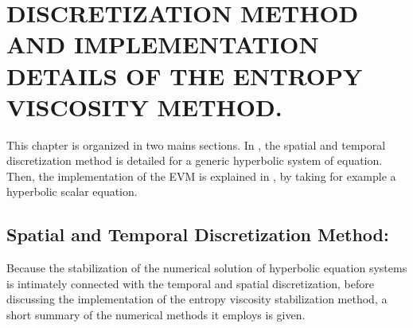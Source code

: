 %
%
%

\chapter{\uppercase {Discretization method and implementation details of the entropy viscosity method.}}\label{chap:disc_chap2}
This chapter is organized in two mains sections. In , the spatial and temporal discretization method is detailed for a generic hyperbolic system of equation. Then, the implementation of the EVM is explained in , by taking for example a hyperbolic scalar equation. 
\section{Spatial and Temporal Discretization Method:}\label{sec:disc_sect2}
Because the stabilization of the numerical solution of hyperbolic equation systems is intimately connected with the temporal and
spatial discretization, before discussing the implementation of the entropy viscosity stabilization method, a short summary of the
numerical methods it employs is given.
%

